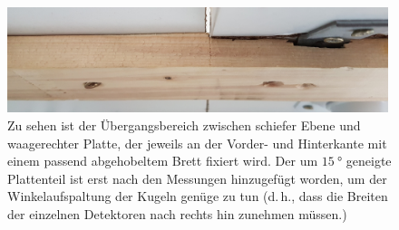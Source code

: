 \begin{figure}[htbp]
\vspace*{0.2cm}
\centering
 \includegraphics[width=0.99\textwidth]{images/brettvorderplatte.jpg}
  \caption[Übergangsbereich schiefe Ebene]{Zu sehen ist der Übergangsbereich zwischen schiefer Ebene und waagerechter Platte, der jeweils an der Vorder- und Hinterkante mit einem passend abgehobeltem Brett fixiert wird. Der um $\SI{15}{\degree}$ geneigte Plattenteil ist erst nach den Messungen hinzugefügt worden, um der Winkelaufspaltung der Kugeln genüge zu tun (d.\,h., dass die Breiten der einzelnen Detektoren nach rechts hin zunehmen müssen.)}
  \label{fig:brettvorderplatte}
  \vspace{-0pt}
\end{figure}